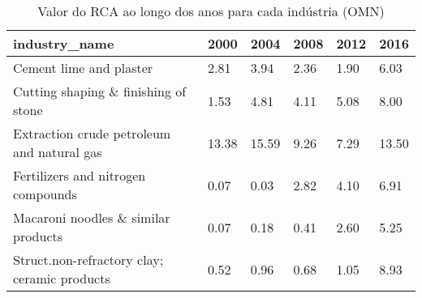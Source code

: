 \begin{table}
\centering
\caption{Valor do RCA ao longo dos anos para cada indústria (OMN)}
\begin{tabular}{p{6cm}p{1.5cm}p{1.5cm}p{1.5cm}p{1.5cm}p{1.5cm}}
\toprule
                               industry\_name &  2000 &  2004 & 2008 & 2012 &  2016 \\
\midrule
                     Cement lime and plaster &  2.81 &  3.94 & 2.36 & 1.90 &  6.03 \\
        Cutting shaping \& finishing of stone &  1.53 &  4.81 & 4.11 & 5.08 &  8.00 \\
  Extraction crude petroleum and natural gas & 13.38 & 15.59 & 9.26 & 7.29 & 13.50 \\
          Fertilizers and nitrogen compounds &  0.07 &  0.03 & 2.82 & 4.10 &  6.91 \\
         Macaroni noodles \& similar products &  0.07 &  0.18 & 0.41 & 2.60 &  5.25 \\
Struct.non-refractory clay; ceramic products &  0.52 &  0.96 & 0.68 & 1.05 &  8.93 \\
\bottomrule
\end{tabular}
\end{table}
